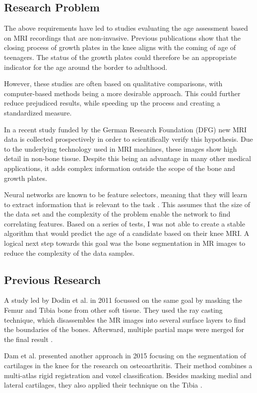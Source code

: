 \subsection{Research Problem}

The above requirements have led to studies evaluating the age assessment based on MRI recordings that are non-invasive. Previous publications \cite{Saring2014}\cite{Jopp2007} show that the closing process of growth plates in the knee aligns with the coming of age of teenagers. The status of the growth plates could therefore be an appropriate indicator for the age around the border to adulthood.

However, these studies are often based on qualitative comparisons, with computer-based methods being a more desirable approach. This could further reduce prejudiced results, while speeding up the process and creating a standardized measure. 

In a recent study funded by the German Research Foundation (DFG) new MRI data is collected prospectively in order to scientifically verify this hypothesis. Due to the underlying technology used in MRI machines, these images show high detail in non-bone tissue. Despite this being an advantage in many other medical applications, it adds complex information outside the scope of the bone and growth plates.

Neural networks are known to be feature selectors, meaning that they will learn to extract information that is relevant to the task \cite{Setiono1997}. This assumes that the size of the data set and the complexity of the problem enable the network to find correlating features. Based on a series of tests, I was not able to create a stable algorithm that would predict the age of a candidate based on their knee MRI. A logical next step towards this goal was the bone segmentation in MR images to reduce the complexity of the data samples.

\subsection{Previous Research}

A study led by Dodin et al. in 2011 focussed on the same goal by masking the Femur and Tibia bone from other soft tissue. They used the ray casting technique, which disassembles the MR images into several surface layers to find the boundaries of the bones. Afterward, multiple partial maps were merged for the final result \cite{Dodin2011}.

Dam et al. presented another approach in 2015 focusing on the segmentation of cartilages in the knee for the research on osteoarthritis. Their method combines a multi-atlas rigid registration and voxel classification. Besides masking medial and lateral cartilages, they also applied their technique on the Tibia \cite{Dam}.

